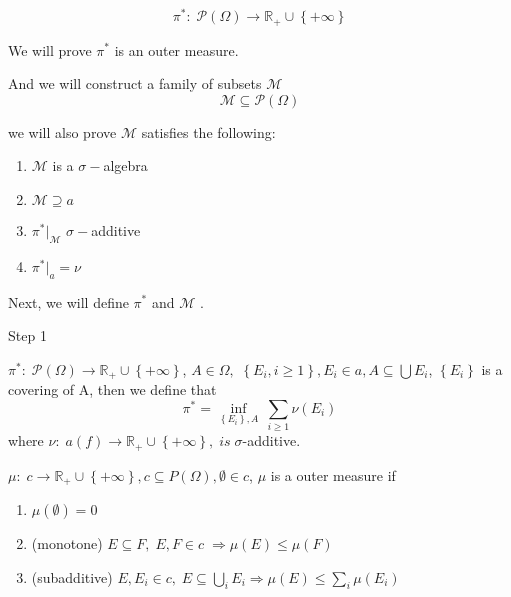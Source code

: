  \begin{equation}
 {\pi ^*}:\;\mathcal{P}\left( \Omega  \right) \to {\mathbb{R}_ + } \cup \left\{ { + \infty } \right\}
 \label{eq4.6}
 \end{equation}
 
We will prove $ {\pi ^*} $ is an outer measure.

And we will construct a family of subsets $ \mathcal{M} $
\begin{equation}
\mathcal{M} \subseteq  \mathcal{P}\left(\Omega\right)
\label{eq4.7}
\end{equation}

we will also prove $ \mathcal{M} $ satisfies the following:
\begin{enumerate}
	\item $ \mathcal{M} $ is a $ \sigma- $algebra
	\item $ \mathcal{M}  \supseteq a$
	\item ${\pi ^*}{|_\mathcal{M}}$ $ \sigma- $additive
	\item ${\pi ^*}{|_a} = \nu $
\end{enumerate}

Next, we will define $ {\pi ^*} $ and $ \mathcal{M} $ .
\newpage 
 
 {\large Step 1}

\begin{definition}[$ {\pi ^*} $]
	$ {\pi ^*}:\;\mathcal{P}\left( \Omega  \right) \to {\mathbb{R}_ + } \cup \left\{ { + \infty } \right\} $, 
	$ A \in \Omega, $ $\left\{ {{E_i},i \geqslant 1} \right\},{E_i} \in a,A \subseteq \bigcup {{E_i}} $, $\left\{ {{E_i}} \right\}$ is a covering of A, then we define that
	\begin{equation}
	{\pi ^*} = \mathop {\inf }\limits_{\left\{ {{E_i}} \right\},A} \ \sum\limits_{i \geqslant 1} {\nu \left( {{E_i}} \right)} 
	\label{eq4.8}
	\end{equation}
	where $\nu :\;a\left( f \right) \to {\mathbb{R}_ + } \cup \left\{ { + \infty } \right\},\; is \; \sigma $-additive. 
	\label{def4.1}
\end{definition}



\begin{definition}
	$\mu :\;c \to {\mathbb{R}_ + } \cup \left\{ { + \infty } \right\},c \subseteq P\left( \Omega  \right),\emptyset  \in c$, $ \mu  $ is a outer measure if
	\begin{enumerate}
		\item $\mu \left( \emptyset  \right) = 0$
		\item (monotone) $E \subseteq F,\;E,F \in c\; \Rightarrow \mu \left( E \right) \leqslant \mu \left( F \right)$
		\item (subadditive) $E,{E_i} \in c,\;E \subseteq \bigcup\limits_i {{E_i}}  \Rightarrow \mu \left( E \right) \leqslant \sum\limits_i {\mu \left( {{E_i}} \right)} $
	\end{enumerate}
	\label{def4.2}
\end{definition}

